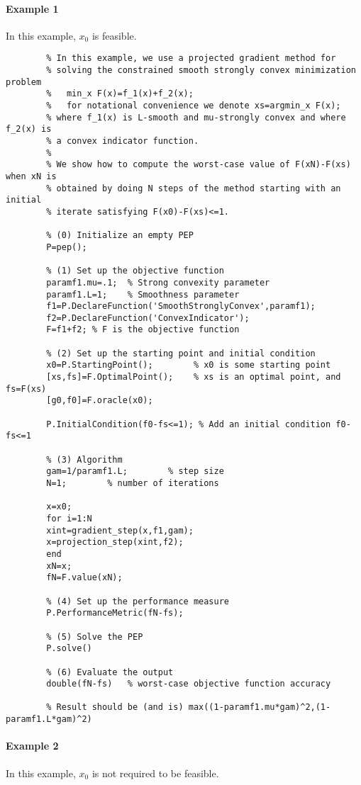 \documentclass[11pt,a4paper]{article}
\begin{document}
		\paragraph{Example 1} In this example, $x_0$ is feasible.
		\begin{lstlisting}
		% In this example, we use a projected gradient method for
		% solving the constrained smooth strongly convex minimization problem
		%   min_x F(x)=f_1(x)+f_2(x); 
		%   for notational convenience we denote xs=argmin_x F(x);
		% where f_1(x) is L-smooth and mu-strongly convex and where f_2(x) is
		% a convex indicator function.
		%
		% We show how to compute the worst-case value of F(xN)-F(xs) when xN is
		% obtained by doing N steps of the method starting with an initial
		% iterate satisfying F(x0)-F(xs)<=1.
		
		% (0) Initialize an empty PEP
		P=pep();
		
		% (1) Set up the objective function
		paramf1.mu=.1;	% Strong convexity parameter
		paramf1.L=1;    % Smoothness parameter
		f1=P.DeclareFunction('SmoothStronglyConvex',paramf1);
		f2=P.DeclareFunction('ConvexIndicator');
		F=f1+f2; % F is the objective function
		
		% (2) Set up the starting point and initial condition
		x0=P.StartingPoint();		 % x0 is some starting point
		[xs,fs]=F.OptimalPoint(); 	 % xs is an optimal point, and fs=F(xs)
		[g0,f0]=F.oracle(x0);
		
		P.InitialCondition(f0-fs<=1); % Add an initial condition f0-fs<=1
		
		% (3) Algorithm
		gam=1/paramf1.L;		% step size
		N=1;		% number of iterations
		
		x=x0;
		for i=1:N
		xint=gradient_step(x,f1,gam);
		x=projection_step(xint,f2);
		end
		xN=x;
		fN=F.value(xN);
		
		% (4) Set up the performance measure
		P.PerformanceMetric(fN-fs);
		
		% (5) Solve the PEP
		P.solve()
		
		% (6) Evaluate the output
		double(fN-fs)   % worst-case objective function accuracy
		
		% Result should be (and is) max((1-paramf1.mu*gam)^2,(1-paramf1.L*gam)^2)
		\end{lstlisting}
		\newpage
		\paragraph{Example 2} In this example, $x_0$ is not required to be feasible.
		
\end{document}
